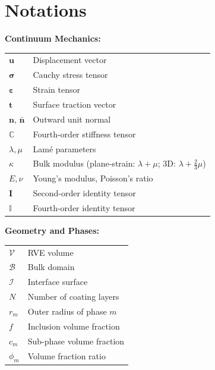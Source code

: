 \documentclass[oneside, 12pt, a4paper, bibliography=totoc]{book}
\newcommand{\bs}[1]{\bm{#1}}                       %
\begin{document}
\cleardoublepage
\listoffigures
{}

\cleardoublepage
\listoftables
{}

\cleardoublepage
\chapter*{Notations}

\textbf{Continuum Mechanics:}
\begin{tabular}{@{}p{2.5cm}p{10cm}@{}}
$\bs{u}$ & Displacement vector \\[0.3em]
$\bs{\sigma}$ & Cauchy stress tensor \\[0.3em]
$\bs{\varepsilon}$ & Strain tensor \\[0.3em]
$\bs{t}$ & Surface traction vector \\[0.3em]
$\bs{n}$, $\bar{\bs{n}}$ & Outward unit normal \\[0.3em]
$\mathbb{C}$ & Fourth-order stiffness tensor \\[0.3em]
$\lambda, \mu$ & Lam\'{e} parameters \\[0.3em]
$\kappa$ & Bulk modulus (plane-strain: $\lambda{+}\mu$; \; 3D: $\lambda{+}\tfrac{2}{3}\mu$) \\[0.3em]
$E, \nu$ & Young's modulus, Poisson's ratio \\[0.3em]
$\bs{I}$ & Second-order identity tensor \\[0.3em]
$\mathbb{I}$ & Fourth-order identity tensor \\[0.3em]
\end{tabular}

\vspace{0.6cm}

\textbf{Geometry and Phases:}
\begin{tabular}{@{}p{2.5cm}p{10cm}@{}}
$\mathcal{V}$ & RVE volume \\[0.3em]
$\mathcal{B}$ & Bulk domain \\[0.3em]
$\mathcal{I}$ & Interface surface \\[0.3em]
$N$ & Number of coating layers \\[0.3em]
$r_m$ & Outer radius of phase $m$ \\[0.3em]
$f$ & Inclusion volume fraction \\[0.3em]
$c_m$ & Sub-phase volume fraction \\[0.3em]
$\phi_m$ & Volume fraction ratio \\[0.3em]
\end{tabular}
\end{document}
